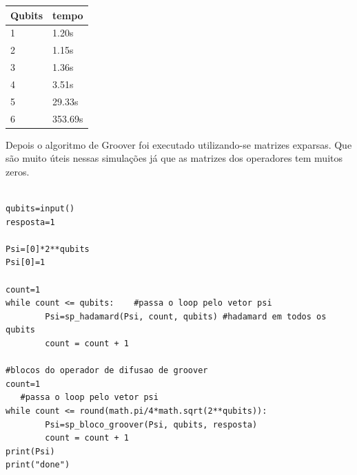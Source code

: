 \documentclass[12pt,a4paper]{article}
\begin{document}
\begin{table}[htb]

\begin{adjustbox}{center}
\begin{tabular}{|l|l|}  
\hline
Qubits  & tempo \\ \hline
1  & 1.20s \\ \hline
2  &  1.15s\\ \hline
3  &   1.36s\\ \hline
4  &  3.51s\\ \hline
5  &  29.33s\\ \hline
6  &   353.69s\\ \hline

\end{tabular}
\end{adjustbox}
\end{table}


Depois o algoritmo de Groover foi executado utilizando-se matrizes exparsas. Que são muito úteis nessas simulações já que as matrizes dos operadores tem muitos zeros.

\begin{verbatim}
    
qubits=input()
resposta=1

Psi=[0]*2**qubits
Psi[0]=1

count=1
while count <= qubits:    #passa o loop pelo vetor psi
        Psi=sp_hadamard(Psi, count, qubits) #hadamard em todos os qubits
        count = count + 1

#blocos do operador de difusao de groover
count=1
   #passa o loop pelo vetor psi
while count <= round(math.pi/4*math.sqrt(2**qubits)): 
        Psi=sp_bloco_groover(Psi, qubits, resposta)
        count = count + 1
print(Psi)
print("done")

\end{verbatim}
\end{document}
